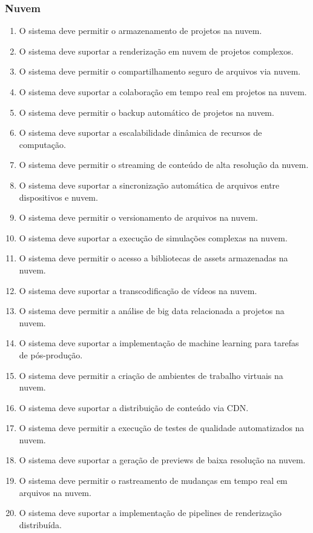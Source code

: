 \subsubsection{Nuvem}
\begin{enumerate}
  \item O sistema deve permitir o armazenamento de projetos na nuvem.
  \item O sistema deve suportar a renderização em nuvem de projetos complexos.
  \item O sistema deve permitir o compartilhamento seguro de arquivos via nuvem.
  \item O sistema deve suportar a colaboração em tempo real em projetos na nuvem.
  \item O sistema deve permitir o backup automático de projetos na nuvem.
  \item O sistema deve suportar a escalabilidade dinâmica de recursos de computação.
  \item O sistema deve permitir o streaming de conteúdo de alta resolução da nuvem.
  \item O sistema deve suportar a sincronização automática de arquivos entre dispositivos e nuvem.
  \item O sistema deve permitir o versionamento de arquivos na nuvem.
  \item O sistema deve suportar a execução de simulações complexas na nuvem.
  \item O sistema deve permitir o acesso a bibliotecas de assets armazenadas na nuvem.
  \item O sistema deve suportar a transcodificação de vídeos na nuvem.
  \item O sistema deve permitir a análise de big data relacionada a projetos na nuvem.
  \item O sistema deve suportar a implementação de machine learning para tarefas de pós-produção.
  \item O sistema deve permitir a criação de ambientes de trabalho virtuais na nuvem.
  \item O sistema deve suportar a distribuição de conteúdo via CDN.
  \item O sistema deve permitir a execução de testes de qualidade automatizados na nuvem.
  \item O sistema deve suportar a geração de previews de baixa resolução na nuvem.
  \item O sistema deve permitir o rastreamento de mudanças em tempo real em arquivos na nuvem.
  \item O sistema deve suportar a implementação de pipelines de renderização distribuída.
\end{enumerate}

